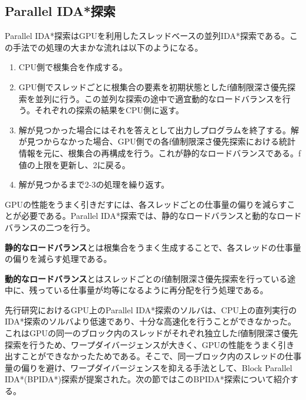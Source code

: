 \documentclass[a4paper,11pt,oneside,openany]{jsbook}
\begin{document}
\subsection{Parallel IDA*探索}
Parallel IDA*探索\cite{HA17}はGPUを利用したスレッドベースの並列IDA*探索である。この手法での処理の大まかな流れは以下のようになる。
\begin{enumerate}
 \item CPU側で根集合を作成する。
 \item GPU側でスレッドごとに根集合の要素を初期状態としたf値制限深さ優先探索を並列に行う。この並列な探索の途中で適宜動的なロードバランスを行う。それぞれの探索の結果をCPU側に返す。
 \item 解が見つかった場合にはそれを答えとして出力しプログラムを終了する。解が見つからなかった場合、GPU側での各f値制限深さ優先探索における統計情報を元に、根集合の再構成を行う。これが静的なロードバランスである。f値の上限を更新し、2に戻る。
 \item 解が見つかるまで2-3の処理を繰り返す。
\end{enumerate}

GPUの性能をうまく引きだすには、各スレッドごとの仕事量の偏りを減らすことが必要である。Parallel IDA*探索では、静的なロードバランスと動的なロードバランスの二つを行う。

{\bf 静的なロードバランス}とは根集合をうまく生成することで、各スレッドの仕事量の偏りを減らす処理である。

{\bf 動的なロードバランス}とはスレッドごとのf値制限深さ優先探索を行っている途中に、残っている仕事量が均等になるように再分配を行う処理である。

先行研究\cite{HA17}におけるGPU上のParallel IDA*探索のソルバは、CPU上の直列実行のIDA*探索のソルバより低速であり、十分な高速化を行うことができなかった。これはGPUの同一のブロック内のスレッドがそれぞれ独立したf値制限深さ優先探索を行うため、ワープダイバージェンスが大きく、GPUの性能をうまく引き出すことができなかったためである。そこで、同一ブロック内のスレッドの仕事量の偏りを避け、ワープダイバージェンスを抑える手法として、Block Parallel IDA*(BPIDA*)探索\cite{HA17}が提案された。次の節ではこのBPIDA*探索について紹介する。
\end{document}
